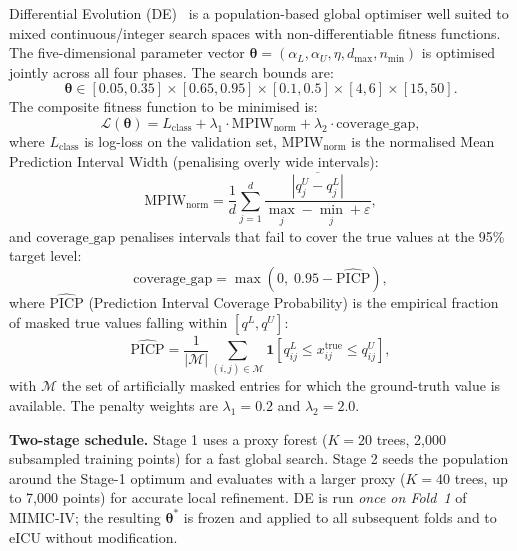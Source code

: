 \documentclass[a4paper,fleqn,longmktitle]{cas-sc}
\begin{document}
	Differential Evolution (DE)~\citep{storn1997differential} is a
	population-based global optimiser well suited to mixed
	continuous/integer search spaces with non-differentiable fitness
	functions.
	The five-dimensional parameter vector
	$\boldsymbol{\theta} = (\alpha_L, \alpha_U, \eta, d_{\max},
	n_{\min})$ is optimised jointly across all four phases.
	The search bounds are:
	\begin{equation}
		\boldsymbol{\theta} \in
		[0.05, 0.35] \times [0.65, 0.95] \times [0.1, 0.5]
		\times [4, 6] \times [15, 50].
		\label{eq:de_bounds}
	\end{equation}
	The composite fitness function to be minimised is:
	\begin{equation}
		\mathcal{L}(\boldsymbol{\theta})
		= L_{\text{class}}
		+ \lambda_1 \cdot \text{MPIW}_{\text{norm}}
		+ \lambda_2 \cdot \text{coverage\_gap},
		\label{eq:composite_fitness}
	\end{equation}
	where $L_{\text{class}}$ is log-loss on the validation set,
	$\text{MPIW}_{\text{norm}}$ is the normalised Mean Prediction
	Interval Width (penalising overly wide intervals):
	\begin{equation}
		\text{MPIW}_{\text{norm}} =
		\frac{1}{d} \sum_{j=1}^{d}
		\frac{\overline{|q^U_j - q^L_j|}}{\max_j - \min_j + \varepsilon},
		\label{eq:mpiw}
	\end{equation}
	and $\text{coverage\_gap}$ penalises intervals that fail to cover
	the true values at the 95\% target level:
	\begin{equation}
		\text{coverage\_gap} =
		\max\!\left(0,\; 0.95 - \widehat{\text{PICP}}\right),
		\label{eq:coverage_gap}
	\end{equation}
	where $\widehat{\text{PICP}}$ (Prediction Interval Coverage
	Probability) is the empirical fraction of masked true values
	falling within $[q^L, q^U]$:
	\begin{equation}
		\widehat{\text{PICP}} =
		\frac{1}{|\mathcal{M}|}
		\sum_{(i,j)\in\mathcal{M}}
		\mathbf{1}\!\left[q^L_{ij} \le x^{\text{true}}_{ij} \le q^U_{ij}\right],
		\label{eq:picp}
	\end{equation}
	with $\mathcal{M}$ the set of artificially masked entries for which
	the ground-truth value is available.
	The penalty weights are $\lambda_1 = 0.2$ and $\lambda_2 = 2.0$.
	
	\textbf{Two-stage schedule.}
	Stage 1 uses a proxy forest ($K = 20$ trees, 2{,}000
	subsampled training points) for a fast global search.
	Stage 2 seeds the population around the Stage-1 optimum and
	evaluates with a larger proxy ($K = 40$ trees, up to 7{,}000 points)
	for accurate local refinement.
	DE is run \emph{once on Fold~1} of MIMIC-IV; the resulting
	$\boldsymbol{\theta}^*$ is frozen and applied to all subsequent folds
	and to eICU without modification.
	
\end{document}
